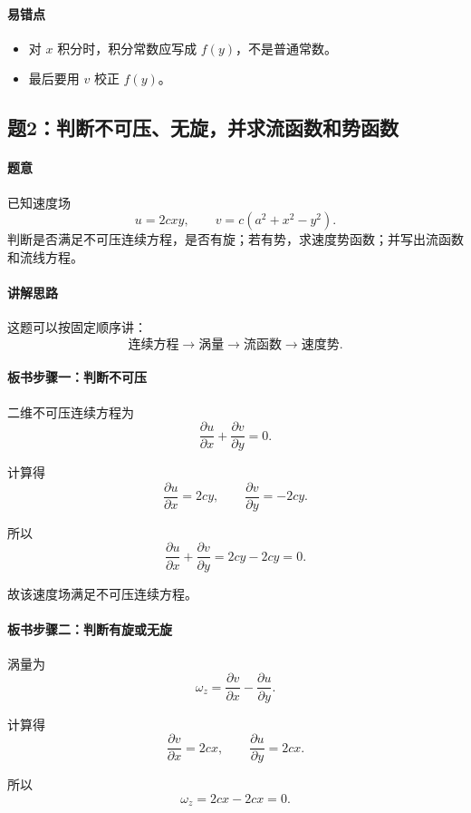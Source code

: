 \documentclass[12pt,a4paper]{ctexart}
\begin{document}
\paragraph{易错点}
\begin{itemize}
  \item 对 $x$ 积分时，积分常数应写成 $f(y)$，不是普通常数。
  \item 最后要用 $v$ 校正 $f(y)$。
\end{itemize}

\subsection*{题2：判断不可压、无旋，并求流函数和势函数}

\paragraph{题意}
已知速度场
\[
u=2cxy,\qquad
v=c(a^2+x^2-y^2).
\]
判断是否满足不可压连续方程，是否有旋；若有势，求速度势函数；并写出流函数和流线方程。

\paragraph{讲解思路}
这题可以按固定顺序讲：
\[
\text{连续方程}\rightarrow
\text{涡量}\rightarrow
\text{流函数}\rightarrow
\text{速度势}.
\]

\paragraph{板书步骤一：判断不可压}
二维不可压连续方程为
\[
\frac{\partial u}{\partial x}
+\frac{\partial v}{\partial y}=0.
\]

计算得
\[
\frac{\partial u}{\partial x}=2cy,
\qquad
\frac{\partial v}{\partial y}=-2cy.
\]

所以
\[
\frac{\partial u}{\partial x}
+\frac{\partial v}{\partial y}
=2cy-2cy=0.
\]

故该速度场满足不可压连续方程。

\paragraph{板书步骤二：判断有旋或无旋}
涡量为
\[
\omega_z=
\frac{\partial v}{\partial x}
-\frac{\partial u}{\partial y}.
\]

计算得
\[
\frac{\partial v}{\partial x}=2cx,
\qquad
\frac{\partial u}{\partial y}=2cx.
\]

所以
\[
\omega_z=2cx-2cx=0.
\]
\end{document}

